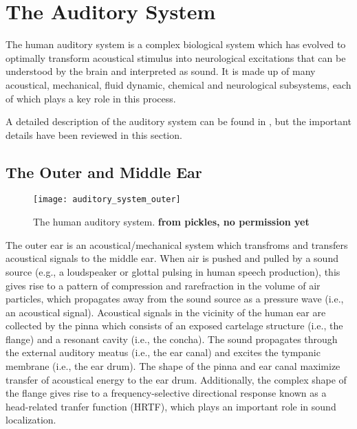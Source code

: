 


\section{The Auditory System}

The human auditory system is a complex biological system which has evolved to optimally transform acoustical stimulus into neurological excitations that can be understood by the brain and interpreted as sound. It is made up of many acoustical, mechanical, fluid dynamic, chemical and neurological subsystems, each of which plays a key role in this process.

A detailed description of the auditory system can be found in \cite{pickles2013}, but the important details have been reviewed in this section.

\subsection{The Outer and Middle Ear}

\begin{figure}[H]
	\centering
	\texttt{[image: auditory\_system\_outer]}
	\caption[The human auditory system]{The human auditory system. \textbf{from pickles, no permission yet}}
	\label{fig:auditory_system_outer}
\end{figure}

The outer ear is an acoustical/mechanical system which transfroms and transfers acoustical signals to the middle ear. When air is pushed and pulled by a sound source (e.g., a loudspeaker or glottal pulsing in human speech production), this gives rise to a pattern of compression and rarefraction in the volume of air particles, which propagates away from the sound source as a pressure wave (i.e., an acoustical signal). Acoustical signals in the vicinity of the human ear are collected by the pinna which consists of an exposed cartelage structure (i.e., the flange) and a resonant cavity (i.e., the concha). The sound propagates through the external auditory meatus (i.e., the ear canal) and excites the tympanic membrane (i.e., the ear drum). The shape of the pinna and ear canal maximize transfer of acoustical energy to the ear drum. Additionally, the complex shape of the flange gives rise to a frequency-selective directional response known as a head-related tranfer function (HRTF), which plays an important role in sound localization.

